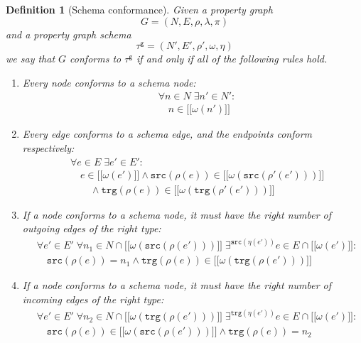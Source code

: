 \documentclass{article}
\newtheorem{definition}[theorem]{Definition}
\newcommand{\src}{\mathtt{src}}
\newcommand{\trg}{\mathtt{trg}}
\newcommand{\gtype}{\tau^\mathsf{g}}
\newcommand{\lsem}{\ensuremath{[\![}}
\newcommand{\rsem}{\ensuremath{]\!]}}
\newcommand{\sem}[1]{\ensuremath{\lsem #1 \rsem}}
\begin{document}
\begin{definition}[Schema conformance]
  Given a property graph $$G = (N, E, \rho, \lambda, \pi)$$ and a property graph schema $$\gtype = (N', E', \rho', \omega, \eta)$$ we say that $G$ \emph{conforms} to $\gtype$ if and only if all of the following rules hold.

  \begin{enumerate}
    \item\label{rule:conformance-card-node}
    Every node conforms to a schema node:
    \begin{align*}
      &\forall n \in N \; \exists n' \in N' :\\
      &\quad n \in \sem{\omega(n')}
    \end{align*}
    
    \item\label{rule:conformance-card-edge}
    Every edge conforms to a schema edge, and the endpoints conform respectively:
    \begin{align*}
      &\forall e \in E \; \exists e' \in E' :\\
      &\quad e \in \sem{\omega(e')} \wedge \src(\rho(e)) \in \sem{\omega(\src(\rho'(e')))}\\
      &\quad\quad\wedge \trg(\rho(e)) \in \sem{\omega(\trg(\rho'(e')))}
    \end{align*}
    
    \item\label{rule:conformance-card-out}
    If a node conforms to a schema node, it must have the right number of outgoing edges of the right type:
    \begin{align*}
      &\forall e' \in E' \; \forall n_1 \in N \cap \sem{\omega(\src(\rho(e')))} \; \exists^{\src(\eta(e'))} e \in E \cap \sem{\omega(e')} :\\
      &\quad \src(\rho(e)) = n_1 \wedge \trg(\rho(e)) \in \sem{\omega(\trg(\rho(e')))}
    \end{align*}

    \item\label{rule:conformance-card-in}
    If a node conforms to a schema node, it must have the right number of incoming edges of the right type:
    \begin{align*}
      &\forall e' \in E' \; \forall n_2 \in N \cap \sem{\omega(\trg(\rho(e')))} \; \exists^{\trg(\eta(e'))} e \in E \cap \sem{\omega(e')} :\\
      &\quad \src(\rho(e)) \in \sem{\omega(\src(\rho(e')))} \wedge \trg(\rho(e)) = n_2
    \end{align*}
  \end{enumerate}
\end{definition}
\end{document}
